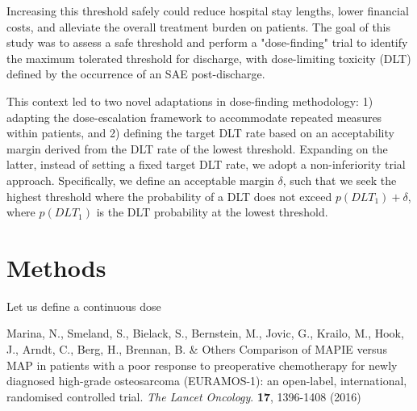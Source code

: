 \documentclass[12pt]{article}
\begin{document}
Increasing this threshold safely could reduce hospital stay lengths, lower financial costs, and alleviate the overall treatment burden on patients. The goal of this study was to assess a safe threshold and perform a "dose-finding" trial to identify the maximum tolerated threshold for discharge, with dose-limiting toxicity (DLT) defined by the occurrence of an SAE post-discharge.

This context led to two novel adaptations in dose-finding methodology: 1) adapting the dose-escalation framework to accommodate repeated measures within patients, and 2) defining the target DLT rate based on an acceptability margin derived from the DLT rate of the lowest threshold. Expanding on the latter, instead of setting a fixed target DLT rate, we adopt a non-inferiority trial approach. Specifically, we define an acceptable margin $\delta$, such that we seek the highest threshold where the probability of a DLT does not exceed $p(DLT_{1})+\delta$, where $p(DLT_{1})$ is the DLT probability at the lowest threshold.

	\section{Methods}
	
Let us define a continuous dose 
	
	
	
	\begin{thebibliography}{10}
		
	Marina, N., Smeland, S., Bielack, S., Bernstein, M., Jovic, G., Krailo, M., Hook, J., Arndt, C., Berg, H., Brennan, B. \& Others Comparison of MAPIE versus MAP in patients with a poor response to preoperative chemotherapy for newly diagnosed high-grade osteosarcoma (EURAMOS-1): an open-label, international, randomised controlled trial. {\em The Lancet Oncology}. \textbf{17}, 1396-1408 (2016)
	
		
		
	\end{thebibliography}
	
	
	
\end{document}
